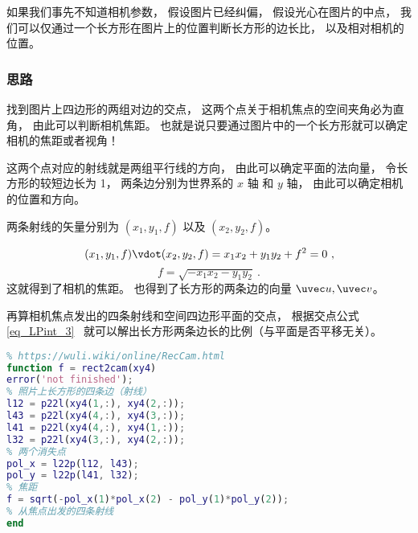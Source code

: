 
\begin{issues}
\issueDraft
\end{issues}


如果我们事先不知道相机参数， 假设图片已经纠偏， 假设光心在图片的中点， 我们可以仅通过一个长方形在图片上的位置判断长方形的边长比， 以及相对相机的位置。

\subsubsection{思路}

找到图片上四边形的两组对边的交点， 这两个点关于相机焦点的空间夹角必为直角， 由此可以判断相机焦距。 也就是说只要通过图片中的一个长方形就可以确定相机的焦距或者视角！

这两个点对应的射线就是两组平行线的方向， 由此可以确定平面的法向量， 令长方形的较短边长为 1， 两条边分别为世界系的 $x$ 轴 和 $y$ 轴， 由此可以确定相机的位置和方向。

两条射线的矢量分别为 $(x_1, y_1, f)$ 以及 $(x_2, y_2, f)$。

\begin{equation}
(x_1, y_1, f)\vdot (x_2, y_2, f) = x_1 x_2 + y_1 y_2 + f^2 = 0~,
\end{equation}
\begin{equation}
f = \sqrt{-x_1 x_2 - y_1 y_2}~.
\end{equation}
这就得到了相机的焦距。 也得到了长方形的两条边的向量 $\uvec u, \uvec v$。

再算相机焦点发出的四条射线和空间四边形平面的交点， 根据交点公式\autoref{eq_LPint_3}~ 就可以解出长方形两条边长的比例（与平面是否平移无关）。

\begin{lstlisting}[language=matlab,caption=rect2cam]
% 长方形相机定位法
% https://wuli.wiki/online/RecCam.html
function f = rect2cam(xy4)
error('not finished');
% 照片上长方形的四条边（射线）
l12 = p22l(xy4(1,:), xy4(2,:));
l43 = p22l(xy4(4,:), xy4(3,:));
l41 = p22l(xy4(4,:), xy4(1,:));
l32 = p22l(xy4(3,:), xy4(2,:));
% 两个消失点
pol_x = l22p(l12, l43);
pol_y = l22p(l41, l32);
% 焦距
f = sqrt(-pol_x(1)*pol_x(2) - pol_y(1)*pol_y(2));
% 从焦点出发的四条射线
end
\end{lstlisting}
